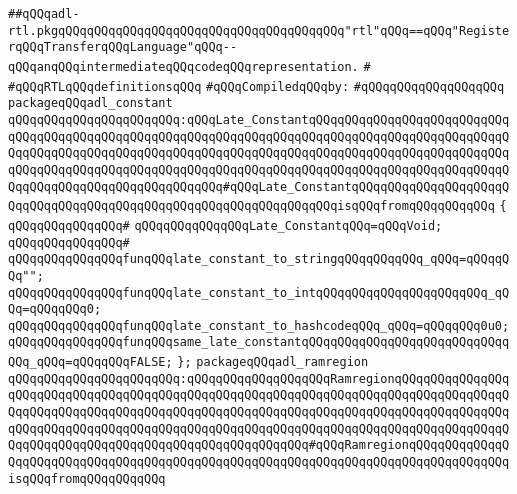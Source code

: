 \label{src/lib/compiler/back/low/tools/arch/adl-rtl.pkg}
\verb|##qQQqadl-rtl.pkgqQQqqQQqqQQqqQQqqQQqqQQqqQQqqQQqqQQqqQQq"rtl"qQQq==qQQq"RegisterqQQqTransferqQQqLanguage"qQQq--qQQqanqQQqintermediateqQQqcodeqQQqrepresentation.|\newline
\verb|#|\newline
\verb|#qQQqRTLqQQqdefinitionsqQQq|\newline
\newline
\verb|#qQQqCompiledqQQqby:|\newline
\verb|#qQQqqQQqqQQqqQQqqQQq|\newline
\newline
\verb|packageqQQqadl_constant|\newline
\verb|qQQqqQQqqQQqqQQqqQQqqQQq:qQQqLate_ConstantqQQqqQQqqQQqqQQqqQQqqQQqqQQqqQQqqQQqqQQqqQQqqQQqqQQqqQQqqQQqqQQqqQQqqQQqqQQqqQQqqQQqqQQqqQQqqQQqqQQqqQQqqQQqqQQqqQQqqQQqqQQqqQQqqQQqqQQqqQQqqQQqqQQqqQQqqQQqqQQqqQQqqQQqqQQqqQQqqQQqqQQqqQQqqQQqqQQqqQQqqQQqqQQqqQQqqQQqqQQqqQQqqQQqqQQqqQQqqQQqqQQqqQQqqQQqqQQqqQQqqQQqqQQq#qQQqLate_ConstantqQQqqQQqqQQqqQQqqQQqqQQqqQQqqQQqqQQqqQQqqQQqqQQqqQQqqQQqqQQqqQQqqQQqisqQQqfromqQQqqQQqqQQq|\newline
\verb|{|\newline
\verb|qQQqqQQqqQQqqQQq#|\newline
\verb|qQQqqQQqqQQqqQQqLate_ConstantqQQq=qQQqVoid;|\newline
\verb|qQQqqQQqqQQqqQQq#|\newline
\verb|qQQqqQQqqQQqqQQqfunqQQqlate_constant_to_stringqQQqqQQqqQQq_qQQq=qQQqqQQq"";|\newline
\verb|qQQqqQQqqQQqqQQqfunqQQqlate_constant_to_intqQQqqQQqqQQqqQQqqQQqqQQq_qQQq=qQQqqQQq0;|\newline
\verb|qQQqqQQqqQQqqQQqfunqQQqlate_constant_to_hashcodeqQQq_qQQq=qQQqqQQq0u0;|\newline
\verb|qQQqqQQqqQQqqQQqfunqQQqsame_late_constantqQQqqQQqqQQqqQQqqQQqqQQqqQQqqQQq_qQQq=qQQqqQQqFALSE;|\newline
\verb|};|\newline
\newline
\verb|packageqQQqadl_ramregion|\newline
\verb|qQQqqQQqqQQqqQQqqQQqqQQq:qQQqqQQqqQQqqQQqqQQqRamregionqQQqqQQqqQQqqQQqqQQqqQQqqQQqqQQqqQQqqQQqqQQqqQQqqQQqqQQqqQQqqQQqqQQqqQQqqQQqqQQqqQQqqQQqqQQqqQQqqQQqqQQqqQQqqQQqqQQqqQQqqQQqqQQqqQQqqQQqqQQqqQQqqQQqqQQqqQQqqQQqqQQqqQQqqQQqqQQqqQQqqQQqqQQqqQQqqQQqqQQqqQQqqQQqqQQqqQQqqQQqqQQqqQQqqQQqqQQqqQQqqQQqqQQqqQQqqQQqqQQqqQQqqQQq#qQQqRamregionqQQqqQQqqQQqqQQqqQQqqQQqqQQqqQQqqQQqqQQqqQQqqQQqqQQqqQQqqQQqqQQqqQQqqQQqqQQqqQQqqQQqisqQQqfromqQQqqQQqqQQq|\newline
